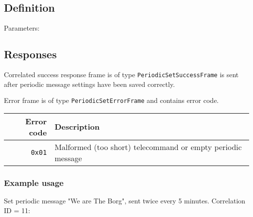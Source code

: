 \subsection{Definition}

Parameters:

\begin{tcarglist}
\end{tcarglist}

\subsection{Responses}
Correlated success response frame is of type \texttt{PeriodicSetSuccessFrame} is sent after periodic message settings have been saved correctly.

Error frame is of type \texttt{PeriodicSetErrorFrame} and contains error code. 

\begin{tabular}{r | l}
    Error code & Description \\ \hline
    \texttt{0x01} & Malformed (too short) telecommand or empty periodic message
\end{tabular}

\subsubsection{Example usage}
Set periodic message "We are The Borg", sent twice every 5 minutes. Correlation ID = 11:
